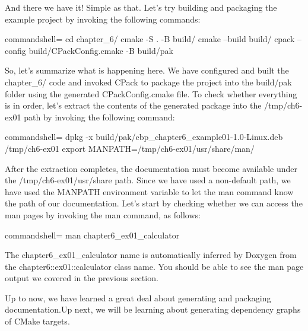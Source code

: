 And there we have it! Simple as that. Let's try building and packaging the example project by invoking the following commands:

\begin{tcblisting}{commandshell={}}
cd chapter_6/
cmake -S . -B build/
cmake --build build/
cpack --config build/CPackConfig.cmake -B build/pak
\end{tcblisting}

So, let's summarize what is happening here. We have configured and built the chapter\_6/ code and invoked CPack to package the project into the build/pak folder using the generated CPackConfig.cmake file. To check whether everything is in order, let's extract the contents of the generated package into the /tmp/ch6-ex01 path by invoking the following command:

\begin{tcblisting}{commandshell={}}
dpkg -x build/pak/cbp_chapter6_example01-1.0-Linux.deb
  /tmp/ch6-ex01
export MANPATH=/tmp/ch6-ex01/usr/share/man/
\end{tcblisting}

After the extraction completes, the documentation must become available under the /tmp/ch6-ex01/usr/share path. Since we have used a non-default path, we have used the MANPATH environment variable to let the man command know the path of our documentation. Let's start by checking whether we can access the man pages by invoking the man command, as follows:

\begin{tcblisting}{commandshell={}}
man chapter6_ex01_calculator
\end{tcblisting}

The chapter6\_ex01\_calculator name is automatically inferred by Doxygen from the chapter6::ex01::calculator class name. You should be able to see the man page output we covered in the previous section.

Up to now, we have learned a great deal about generating and packaging documentation.Up next, we will be learning about generating dependency graphs of CMake targets.



